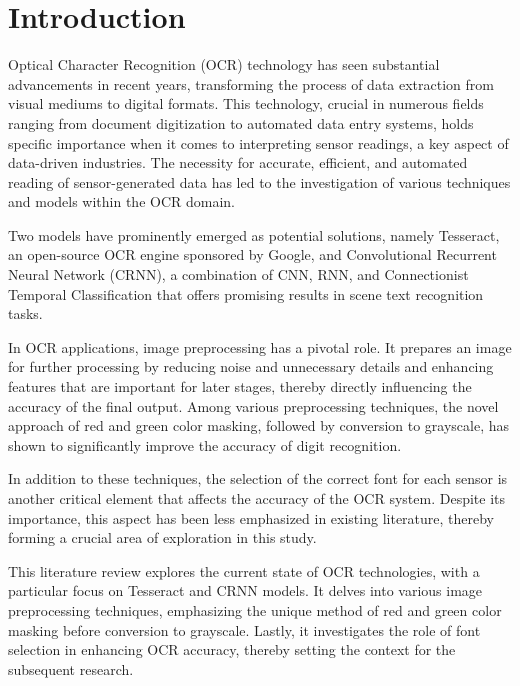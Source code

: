 \chapter{Introduction}
\label{chap:intro}


Optical Character Recognition (OCR) technology has seen substantial advancements in recent years, transforming the process of data extraction from visual mediums to digital formats. This technology, crucial in numerous fields ranging from document digitization to automated data entry systems, holds specific importance when it comes to interpreting sensor readings, a key aspect of data-driven industries. The necessity for accurate, efficient, and automated reading of sensor-generated data has led to the investigation of various techniques and models within the OCR domain.

Two models have prominently emerged as potential solutions, namely Tesseract, an open-source OCR engine sponsored by Google, and Convolutional Recurrent Neural Network (CRNN), a combination of CNN, RNN, and Connectionist Temporal Classification that offers promising results in scene text recognition tasks.

In OCR applications, image preprocessing has a pivotal role. It prepares an image for further processing by reducing noise and unnecessary details and enhancing features that are important for later stages, thereby directly influencing the accuracy of the final output. Among various preprocessing techniques, the novel approach of red and green color masking, followed by conversion to grayscale, has shown to significantly improve the accuracy of digit recognition.

In addition to these techniques, the selection of the correct font for each sensor is another critical element that affects the accuracy of the OCR system. Despite its importance, this aspect has been less emphasized in existing literature, thereby forming a crucial area of exploration in this study.

This literature review explores the current state of OCR technologies, with a particular focus on Tesseract and CRNN models. It delves into various image preprocessing techniques, emphasizing the unique method of red and green color masking before conversion to grayscale. Lastly, it investigates the role of font selection in enhancing OCR accuracy, thereby setting the context for the subsequent research.


